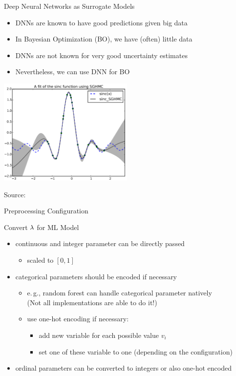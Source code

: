 \begin{frame}[c,fragile]{Deep Neural Networks as Surrogate Models}

\begin{itemize}
	\item DNNs are known to have good predictions given big data
	\item In Bayesian Optimization (BO), we have (often) little data
	\item DNNs are not known for very good uncertainty estimates
	\item Nevertheless, we can use DNN for BO
\end{itemize}

\centering
\includegraphics[width=0.5\textwidth]{images/bo_dnn.png}
\begin{flushright}
	Source: 
\end{flushright}


\end{frame}
\begin{frame}[c]{Preprocessing Configuration}

\begin{block}{Convert $\mathbf{\lambda}$ for ML Model}
\begin{itemize}
\item continuous and integer parameter can be directly passed
\begin{itemize}
\item scaled to $[0,1]$
\end{itemize}
\pause
\item categorical parameters should be encoded if necessary
\begin{itemize}
\item e.$\,$g., random forest can handle categorical parameter natively\\
(Not all implementations are able to do it!) 
\item use one-hot encoding if necessary:
\begin{itemize}
	\item add new variable for each possible value $v_i$
	\item set one of these variable to one (depending on the configuration)
\end{itemize}
\end{itemize}
\pause
\item ordinal parameters can be converted to integers or also one-hot encoded
\end{itemize}
\end{block}


\end{frame}
